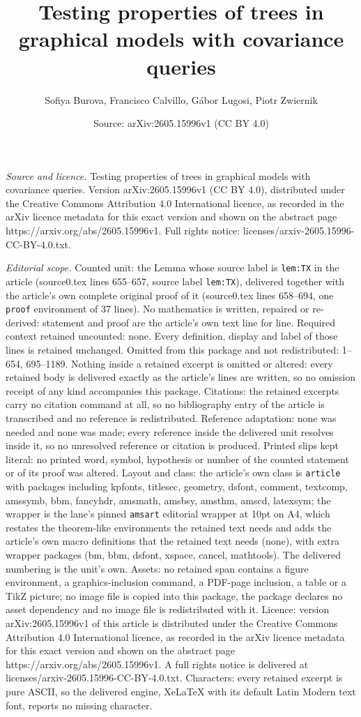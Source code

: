 \documentclass[10pt,a4paper]{amsart}
\title[Testing properties of trees in graphical models with covaria]{Testing properties of trees in graphical models with covariance queries}
\author{Sofiya Burova, Francisco Calvillo, G\'abor Lugosi, Piotr Zwiernik}
\date{Source: arXiv:2605.15996v1 (CC BY 4.0)}
\begin{document}
\maketitle

\noindent\emph{Source and licence.} Testing properties of trees in graphical models with covariance queries. Version arXiv:2605.15996v1 (CC BY 4.0), distributed under the Creative Commons Attribution 4.0 International licence, as recorded in the arXiv licence metadata for this exact version and shown on the abstract page https://arxiv.org/abs/2605.15996v1. Full rights notice: licenses/arxiv-2605.15996-CC-BY-4.0.txt.\par\smallskip

\noindent\textit{Editorial scope.} Counted unit: the Lemma whose source label is \texttt{lem:TX} in the article (source0.tex lines 655--657, source label \texttt{lem:TX}), delivered together with the article's own complete original proof of it (source0.tex lines 658--694, one \texttt{proof} environment of 37 lines). No mathematics is written, repaired or re-derived: statement and proof are the article's own text line for line. Required context retained uncounted: none. Every definition, display and label of those lines is retained unchanged. Omitted from this package and not redistributed: 1--654, 695--1189. Nothing inside a retained excerpt is omitted or altered: every retained body is delivered exactly as the article's lines are written, so no omission receipt of any kind accompanies this package. Citations: the retained excerpts carry no citation command at all, so no bibliography entry of the article is transcribed and no reference is redistributed. Reference adaptation: none was needed and none was made; every reference inside the delivered unit resolves inside it, so no unresolved reference or citation is produced. Printed slips kept literal: no printed word, symbol, hypothesis or number of the counted statement or of its proof was altered. Layout and class: the article's own class is \texttt{article} with packages including kpfonts, titlesec, geometry, dsfont, comment, textcomp, amssymb, bbm, fancyhdr, amsmath, amsbsy, amsthm, amscd, latexsym; the wrapper is the lane's pinned \texttt{amsart} editorial wrapper at 10pt on A4, which restates the theorem-like environments the retained text needs and adds the article's own macro definitions that the retained text needs (none), with extra wrapper packages (bm, bbm, dsfont, xspace, cancel, mathtools). The delivered numbering is the unit's own. Assets: no retained span contains a figure environment, a graphics-inclusion command, a PDF-page inclusion, a table or a TikZ picture; no image file is copied into this package, the package declares no asset dependency and no image file is redistributed with it. Licence: version arXiv:2605.15996v1 of this article is distributed under the Creative Commons Attribution 4.0 International licence, as recorded in the arXiv licence metadata for this exact version and shown on the abstract page https://arxiv.org/abs/2605.15996v1. A full rights notice is delivered at licenses/arxiv-2605.15996-CC-BY-4.0.txt. Characters: every retained excerpt is pure ASCII, so the delivered engine, XeLaTeX with its default Latin Modern text font, reports no missing character.
\end{document}
